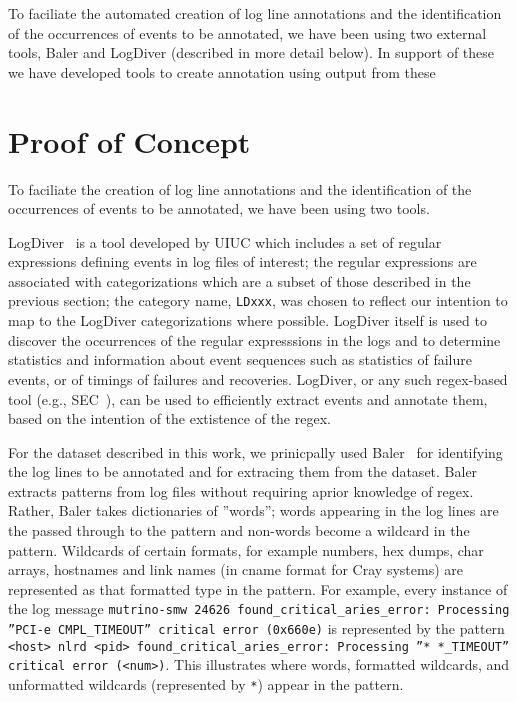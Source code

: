 To faciliate the automated creation of log line annotations
and the identification of the occurrences of events to be annotated,
we have been using two external tools, Baler and LogDiver (described in more detail below).
In support of these we have developed tools to create annotation using output from these

\section{Proof of Concept}
To faciliate the creation of log line annotations
and the identification of the occurrences of events to be annotated,
we have been using two tools.

LogDiver~\cite{LogDiver} is a tool developed by UIUC which includes a set of regular expressions defining
events in log files of interest; the regular expressions are associated with categorizations
which are a subset of those described in the previous section; the
category name, \texttt{LDxxx}, was chosen to reflect our intention to map to the
LogDiver categorizations where possible.
LogDiver itself is used to discover the occurrences of the regular
expresssions in the logs and to determine statistics and information about event sequences
such as statistics of failure events, or of timings of failures and recoveries.
LogDiver, or any such regex-based tool (e.g., SEC~\cite{SEC}), can be used to efficiently extract events
and annotate them, based on the intention of the extistence of the regex.

For the dataset described in this work, we prinicpally used Baler~\cite{Baler} for
identifying the log lines to be annotated and for extracing them from the dataset.
Baler extracts patterns from log files without requiring aprior knowledge of
regex. Rather, Baler takes dictionaries of ''words''; words appearing in the log lines
are the passed through to the pattern and non-words become a wildcard in the pattern.
Wildcards of certain formats, for example numbers, hex dumps, char arrays, hostnames and link names
(in cname format for Cray systems) are represented as that formatted type in the pattern.
For example, every instance of the log message \texttt{mutrino-smw 24626 found\_critical\_aries\_error: Processing ''PCI-e CMPL\_TIMEOUT'' critical error (0x660e)}
is represented by the pattern \texttt{<host> nlrd <pid> found\_critical\_aries\_error: Processing ''* *\_TIMEOUT'' critical error (<num>)}.
This illustrates where words, formatted wildcards, and unformatted wildcards (represented by \texttt{*}) appear in the pattern.

